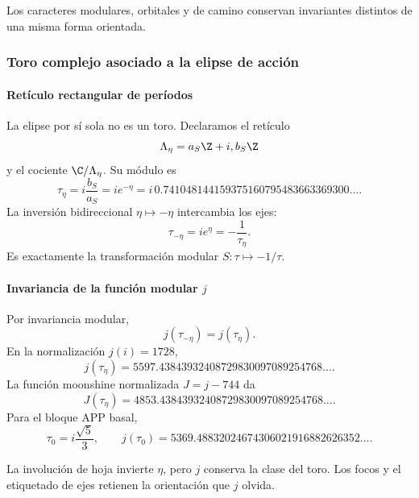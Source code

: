 \noindent Los caracteres modulares, orbitales y de camino conservan invariantes distintos de una misma forma orientada.\par\medskip

\subsubsection{Toro complejo asociado a la elipse de acción}

\paragraph{Retículo rectangular de períodos}

La elipse por sí sola no es un toro. Declaramos el retículo
\begin{equation}
\Lambda_\eta=a_S\Z+i,b_S\Z
\label{eq:lattice}
\end{equation}
y el cociente \(\C/\Lambda_\eta\). Su módulo es
\begin{equation}
\tau_\eta=i\frac{b_S}{a_S}=ie^{-\eta}
=i\,0.741048144159375160795483663369300\ldots.
\label{eq:tau-eta}
\end{equation}
La inversión bidireccional \(\eta\mapsto-\eta\) intercambia los ejes:
\begin{equation}
\tau_{-\eta}=ie^\eta=-\frac1{\tau_\eta}.
\label{eq:modular-S}
\end{equation}
Es exactamente la transformación modular \(S:\tau\mapsto-1/\tau\).

\paragraph{Invariancia de la función modular \(j\)}

Por invariancia modular,
\begin{equation}
\boxed{j(\tau_{-\eta})=j(\tau_\eta).}
\label{eq:j-invariance}
\end{equation}
En la normalización \(j(i)=1728\),
\[
j(\tau_\eta)
=5597.43843932408729830097089254768\ldots.
\]
La función moonshine normalizada \(J=j-744\) da
\[
J(\tau_\eta)
=4853.43843932408729830097089254768\ldots.
\]
Para el bloque APP basal,
\[
\tau_0=i\frac{\sqrt5}{3},
\qquad
j(\tau_0)=5369.48832024674306021916882626352\ldots.
\]

\begin{proposition}
La involución de hoja invierte \(\eta\), pero \(j\) conserva la clase del
toro. Los focos y el etiquetado de ejes retienen la orientación que \(j\)
olvida.
\end{proposition}

